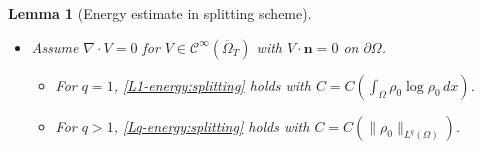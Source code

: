 \documentclass{amsart}
\newtheorem{lemma}[defn]{Lemma}
\numberwithin{equation}{section}
\newcommand{\calC}{{ \mathcal C  }}
\begin{document}
\begin{lemma}[Energy estimate in splitting scheme]
\begin{itemize}
\smallskip 

\item[(iii)] Assume $\nabla\cdot V = 0$ for $V\in\calC^{\infty} (\overline{\Omega}_{T})$ with $V\cdot \textbf{n}=0$ on $\partial \Omega$.

\smallskip 
\begin{itemize}
\item[$\bullet$] For $q=1$, %
\eqref{L1-energy:splitting} holds with $C = C (\int_{\Omega} \rho_0 \log \rho_0 \,dx )$.
\smallskip 
\item[$\bullet$] For $q>1$, %
\eqref{Lq-energy:splitting}
holds with $C = C ( \|\rho_{0}\|_{L^{q} (\Omega)} )$.
\end{itemize}
\end{itemize}
\end{lemma}
\end{document}
